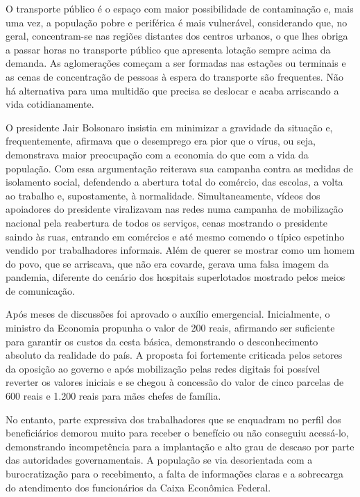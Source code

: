 O transporte público é o espaço com maior possibilidade de
contaminação e, mais uma vez, a população pobre e periférica é mais
vulnerável, considerando que, no geral, concentram-se nas regiões
distantes dos centros urbanos, o que lhes obriga a passar horas
no transporte público que apresenta lotação sempre acima da demanda. As
aglomerações começam a ser formadas nas estações ou terminais e as cenas
de concentração de pessoas à espera do transporte são frequentes. Não há
alternativa para uma multidão que precisa se deslocar e acaba arriscando
a vida cotidianamente.

O presidente Jair Bolsonaro insistia em minimizar a gravidade da
situação e, frequentemente, afirmava que o desemprego era pior que o
vírus, ou seja, demonstrava maior preocupação com a economia do que com
a vida da população. Com essa argumentação reiterava sua campanha contra
as medidas de isolamento social, defendendo a abertura total do
comércio, das escolas, a volta ao trabalho e, supostamente, à
normalidade. Simultaneamente, vídeos dos apoiadores do presidente
viralizavam nas redes numa campanha de mobilização nacional pela
reabertura de todos os serviços, cenas mostrando o presidente saindo às
ruas, entrando em comércios e até mesmo comendo o típico espetinho
vendido por trabalhadores informais. Além de querer se mostrar como um
homem do povo, que se arriscava, que não era covarde, gerava uma falsa
imagem da pandemia, diferente do cenário dos hospitais superlotados
mostrado pelos meios de comunicação.

Após meses de discussões foi aprovado o auxílio emergencial.
Inicialmente, o ministro da Economia propunha o valor de 200 reais,
afirmando ser suficiente para garantir os custos da cesta básica,
demonstrando o desconhecimento absoluto da realidade do país. A proposta
foi fortemente criticada pelos setores da oposição ao governo e após
mobilização pelas redes digitais foi possível reverter os valores
iniciais e se chegou à concessão do valor de cinco parcelas de 
600 reais e 1.200 reais para mães chefes de família.

No entanto, parte expressiva dos trabalhadores que se enquadram no
perfil dos beneficiários demorou muito para receber o benefício ou não
conseguiu acessá-lo, demonstrando incompetência para a implantação e
alto grau de descaso por parte das autoridades governamentais. A
população se via desorientada com a burocratização para o recebimento, a
falta de informações claras e a sobrecarga do atendimento dos
funcionários da Caixa Econômica Federal.

